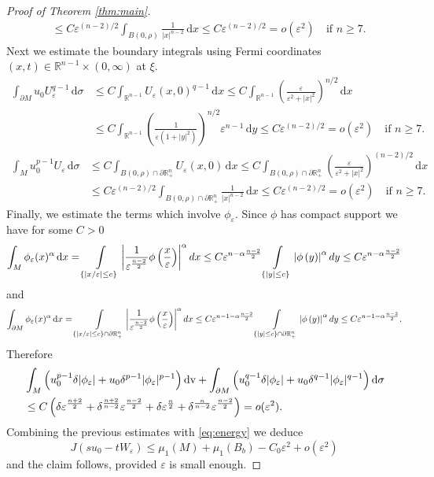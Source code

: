 \documentclass[reqno,11pt,oneside]{amsart}
\numberwithin{equation}{section}
\def\r{\mathbb{R}}
\def\eps{\varepsilon}
\def\im{\int_{M}}
\def\idm{\int_{\partial M}}
\def\d{\,\mathrm{d}}
\def\dv{\,\mathrm{dv}}
\begin{document}
\begin{proof}[Proof of Theorem \ref{thm:main}]
\begin{align*}
& \leq C\eps^{(n-2)/2}\int_{B(0,\rho)} \frac{1}{|x|^{n-2}}\d x \leq C\eps^{(n-2)/2}=o(\eps^2)\quad\text{if \ }n\geq 7.
\end{align*}
Next we estimate the boundary integrals using Fermi coordinates $(x,t)\in\mathbb R^{n-1}\times (0,\infty)$ at $\xi$. 
\begin{align*}
\idm u_0U_\eps^{q-1}\d\sigma &\leq C\int_{\r^{n-1}}U_\eps(x,0)^{q-1}\d x\leq C\int_{\r^{n-1}}\left(\frac{\eps}{\eps^2+|x|^2}\right)^{n/2}\d x \\
& \leq C\int_{\r^{n-1}}\left(\frac{1}{\eps(1+|y|^2)}\right)^{n/2}\eps^{n-1}\d y \leq C\eps^{(n-2)/2}=o(\eps^2)\quad\text{if \ }n\geq 7.
\end{align*}
\begin{align*}
\im u_0^{p-1}U_\eps\d\sigma &\leq C\int_{B(0,\rho)\cap \partial \mathbb R^n_+}U_\eps(x,0 ) \d x\leq   C\int_{B(0,\rho)\cap \partial \mathbb R^n_+} \left(\frac{\eps}{\eps^2+|x|^2}\right)^{(n-2)/2}\d x \\
& \leq C\eps^{(n-2)/2}\int_{B(0,\rho)\cap \partial \mathbb R^n_+} \frac{1}{|x|^{n -2}}\d x \leq C\eps^{(n-2)/2}=o(\eps^2)\quad\text{if \ }n\geq 7.
\end{align*}
Finally, we estimate the terms which involve $\phi_\eps$. Since $\phi$ has compact support we have for some $C>0$
$$\im \phi_\eps(x)^\alpha \d x=\int\limits_{\{|x/\eps|\le c\}}
\left|\frac1{\eps^{n-2\over2}}\phi\left(\frac x\eps\right)\right|^\alpha dx\leq C
\eps^{n-\alpha{n-2\over2}}
\int\limits_{\{|y|\le c\}}
\left| \phi\left(y\right)\right|^\alpha dy\leq  C
\eps^{n-\alpha{n-2\over2}}
$$
and
$$\idm \phi_\eps(x)^\alpha \d x=\int\limits_{\{|x/\eps|\le c\}\cap\partial\mathbb R^n_+}
\left|\frac1{\eps^{n-2\over2}}\phi\left(\frac x\eps\right)\right|^\alpha dx\leq C
\eps^{n-1-\alpha{n-2\over2}}
\int\limits_{\{|y|\le c\}\cap\partial\mathbb R^n_+}
\left| \phi\left(y\right)\right|^\alpha dy\leq  C
\eps^{n-1-\alpha{n-2\over2}}.
$$
Therefore
\begin{align*}
&\im\Big(u_0^{p-1}  \delta|\phi_\eps|+u_0  \delta^{p-1}|\phi_\eps|^{p-1} \Big)\dv + 
\idm\Big(u_0^{q-1} \delta|\phi_\eps| +u_0 \delta^{q-1}|\phi_\eps|^{q-1} \Big)\d\sigma\\
&\leq C \left(\delta\eps^{n+2\over2}+\delta^{n+2\over n-2}\eps^{n-2\over2}
+\delta \eps^{\frac n2}+\delta^{\frac n{n-2}}\eps^{n-2\over2}\right)
 =o(\eps^2).
\end{align*}
Combining the previous estimates with \eqref{eq:energy} we deduce
$$J(su_0-tW_\eps)\leq  \mu_1(M)+\mu_1(B_b)-C_0\eps^2+o(\eps^2) $$
and the claim follows, provided $\eps$ is small enough.
\end{proof}
\end{document}
